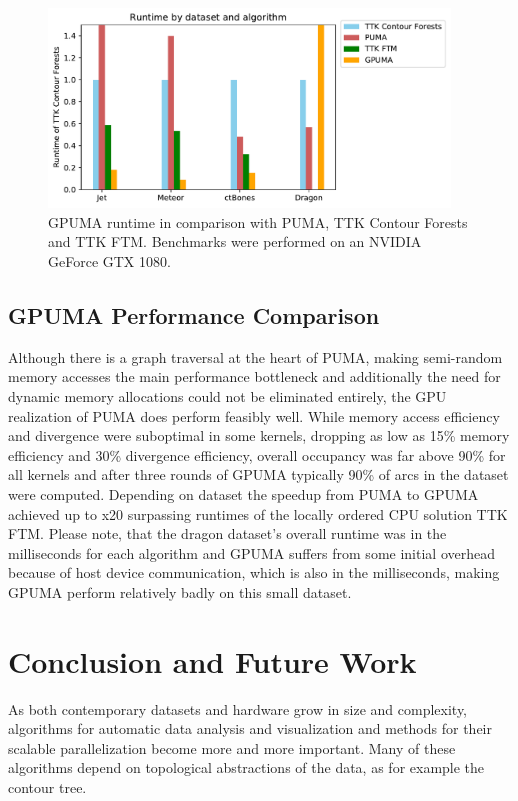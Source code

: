 \documentclass[%
	paper=A4,					%
	twoside=true,				%
	openright,					%
	parskip=full,				%
	chapterprefix=true,			%
	11pt,						%
	headings=normal,			%
	bibliography=totoc,			%
	listof=totoc,				%
	titlepage=on,				%
	captions=tableabove,		%
	draft=false,				%
]{scrreprt}%
\begin{document}
\begin{figure}[h]
\centering
\includegraphics[width=0.95\textwidth]{figures/gruntime.pdf}
\caption{GPUMA runtime in comparison with PUMA, TTK Contour Forests and TTK FTM. Benchmarks were performed on an NVIDIA GeForce GTX 1080.}
\label{fig:runtime}
\end{figure}


\section{GPUMA Performance Comparison}
Although there is a graph traversal at the heart of PUMA, making semi-random memory accesses the main performance bottleneck and additionally the need for dynamic memory allocations could not be eliminated entirely, the GPU realization of PUMA does perform feasibly well. While memory access efficiency and divergence were suboptimal in some kernels, dropping as low as 15\% memory efficiency and 30\% divergence efficiency, overall occupancy was far above 90\% for all kernels and after three rounds of GPUMA typically 90\% of arcs in the dataset were computed. Depending on dataset the speedup from PUMA to GPUMA achieved up to x20 surpassing runtimes of the locally ordered CPU solution TTK FTM. Please note, that the dragon dataset's overall runtime was in the milliseconds for each algorithm and GPUMA suffers from some initial overhead because of host device communication, which is also in the milliseconds, making GPUMA perform relatively badly on this small dataset.


\chapter{Conclusion and Future Work}
As both contemporary datasets and hardware grow in size and complexity, algorithms for automatic data analysis and visualization and methods for their scalable parallelization become more and more important. Many of these algorithms depend on topological abstractions of the data, as for example the contour tree. 
\end{document}
